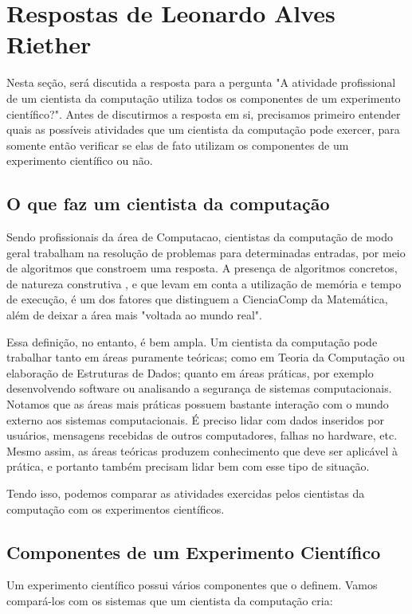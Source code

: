 \section{Respostas de Leonardo Alves Riether\label{tarefa-LeoRiether-componentes-experimento}}

Nesta seção, será discutida a resposta para a pergunta "A atividade profissional de um
cientista da computação utiliza todos os componentes de um experimento científico?". Antes
de discutirmos a resposta em si, precisamos primeiro entender quais as possíveis
atividades que um cientista da computação pode exercer, para somente então verificar se
elas de fato utilizam os componentes de um experimento científico ou não.

\subsection{O que faz um cientista da computação}

Sendo profissionais da área de \gls{Computacao}, cientistas da computação de modo geral
trabalham na resolução de problemas para determinadas entradas, por meio de algoritmos que
constroem uma resposta. A presença de algoritmos concretos, de natureza construtiva , e
que levam em conta a utilização de memória e tempo de execução, é um dos fatores que
distinguem a \gls{CienciaComp} da Matemática, além de deixar a área mais "voltada ao mundo
real".

Essa definição, no entanto, é bem ampla. Um cientista da computação pode trabalhar tanto
em áreas puramente teóricas; como em Teoria da Computação ou elaboração de Estruturas de
Dados; quanto em áreas práticas, por exemplo desenvolvendo software ou analisando a
segurança de sistemas computacionais. Notamos que as áreas mais práticas possuem bastante
interação com o mundo externo aos sistemas computacionais. É preciso lidar com dados
inseridos por usuários, mensagens recebidas de outros computadores, falhas no hardware,
etc. Mesmo assim, as áreas teóricas produzem conhecimento que deve ser aplicável à
prática, e portanto também precisam lidar bem com esse tipo de situação.

Tendo isso, podemos comparar as atividades exercidas pelos cientistas da computação com os
experimentos científicos.

\subsection{Componentes de um Experimento Científico}
Um \gls{experimento} científico possui vários componentes que o definem. Vamos compará-los
com os sistemas que um cientista da computação cria:

